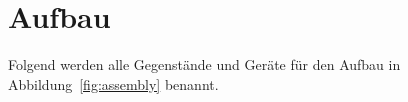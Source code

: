 %

\section{Aufbau}\label{sec:assembly}

Folgend werden alle Gegenstände und Geräte für den Aufbau in Abbildung~\ref{fig:assembly} benannt.

